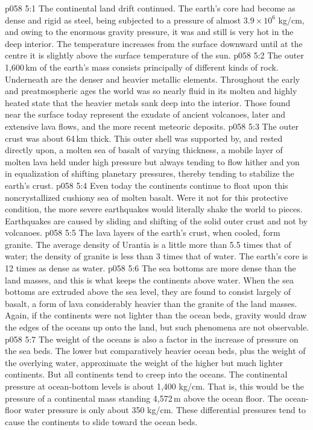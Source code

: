 \vs p058 5:1 The continental land drift continued. The earth’s core had become as dense and rigid as steel, being subjected to a pressure of almost $3.9 \times 10^{6}$ kg/cm, and owing to the enormous gravity pressure, it was and still is very hot in the deep interior. The temperature increases from the surface downward until at the centre it is slightly above the surface temperature of the sun.
\vs p058 5:2 The outer 1,600\,km of the earth’s mass consists principally of different kinds of rock. Underneath are the denser and heavier metallic elements. Throughout the early and preatmospheric ages the world was so nearly fluid in its molten and highly heated state that the heavier metals sank deep into the interior. Those found near the surface today represent the exudate of ancient volcanoes, later and extensive lava flows, and the more recent meteoric deposits.
\vs p058 5:3 The outer crust was about 64\,km thick. This outer shell was supported by, and rested directly upon, a molten sea of basalt of varying thickness, a mobile layer of molten lava held under high pressure but always tending to flow hither and yon in equalization of shifting planetary pressures, thereby tending to stabilize the earth’s crust.
\vs p058 5:4 Even today the continents continue to float upon this noncrystallized cushiony sea of molten basalt. Were it not for this protective condition, the more severe earthquakes would literally shake the world to pieces. Earthquakes are caused by sliding and shifting of the solid outer crust and not by volcanoes.
\vs p058 5:5 \pc The lava layers of the earth’s crust, when cooled, form granite. The average density of Urantia is a little more than 5.5 times that of water; the density of granite is less than 3 times that of water. The earth’s core is 12 times as dense as water.
\vs p058 5:6 The sea bottoms are more dense than the land masses, and this is what keeps the continents above water. When the sea bottoms are extruded above the sea level, they are found to consist largely of basalt, a form of lava considerably heavier than the granite of the land masses. Again, if the continents were not lighter than the ocean beds, gravity would draw the edges of the oceans up onto the land, but such phenomena are not observable.
\vs p058 5:7 The weight of the oceans is also a factor in the increase of pressure on the sea beds. The lower but comparatively heavier ocean beds, plus the weight of the overlying water, approximate the weight of the higher but much lighter continents. But all continents tend to creep into the oceans. The continental pressure at ocean\hyp{}bottom levels is about 1,400 kg/cm. That is, this would be the pressure of a continental mass standing 4,572\,m above the ocean floor. The ocean\hyp{}floor water pressure is only about 350 kg/cm. These differential pressures tend to cause the continents to slide toward the ocean beds.

